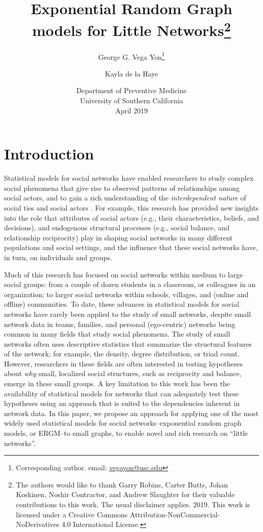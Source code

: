 \documentclass[12pt]{article}
\title{Exponential Random Graph models for Little Networks\footnote{The authors would like to thank Garry Robins, Carter Butts, Johan Koskinen, Noshir Contractor, and Andrew Slaughter for their valuable contributions to this work. The usual disclaimer applies.\textcopyright{} 2019. This work is licensed under a Creative Commons Attribution-NonCommercial-NoDerivatives 4.0 International License.}}
\author{George G. Vega Yon\footnote{Corresponding author. email: \href{mailto:vegayon@usc.edu}{vegayon@usc.edu}} \and Kayla de la Haye}
\date{Department of Preventive Medicine\\University of Southern California\\ April 2019}
\begin{document}
\maketitle


\section{Introduction}

Statistical models for social networks have enabled researchers to study complex social phenomena that give rise to observed patterns of relationships among social actors, and to gain a rich understanding of the \textit{interdependent nature} of social ties and social actors \cite{Snijders2011,lusher2012exponential}. For example, this research has provided new insights into the role that attributes of social actors (e.g., their characteristics, beliefs, and decisions), and endogenous structural processes (e.g., social balance, and relationship reciprocity) play in shaping social networks in many different populations and social settings, and the influence that these social networks have, in turn, on individuals and groups. 

Much of this research has focused on social networks within medium to large social groups: from a couple of dozen students in a classroom, or colleagues in an organization; to larger social networks within schools, villages, and (online and offline) communities. To date, these advances in statistical models for social networks have rarely been applied to the study of small networks, despite small network data in teams, families, and personal (ego-centric) networks being common in many fields that study social phenomena. The study of small networks often uses descriptive statistics that summarize the structural features of the network; for example, the density, degree distribution, or triad count. However, researchers in these fields are often interested in testing hypotheses about \textit{why} small, localized social structures, such as reciprocity and balance, emerge in these small groups. A key limitation to this work has been the availability of statistical models for networks that can adequately test these hypotheses using an approach that is suited to the dependencies inherent in network data. In this paper, we propose an approach for applying one of the most widely used statistical models for social networks--exponential random graph models, or ERGM--to small graphs, to enable novel and rich research on ``little networks''. 
\end{document}
